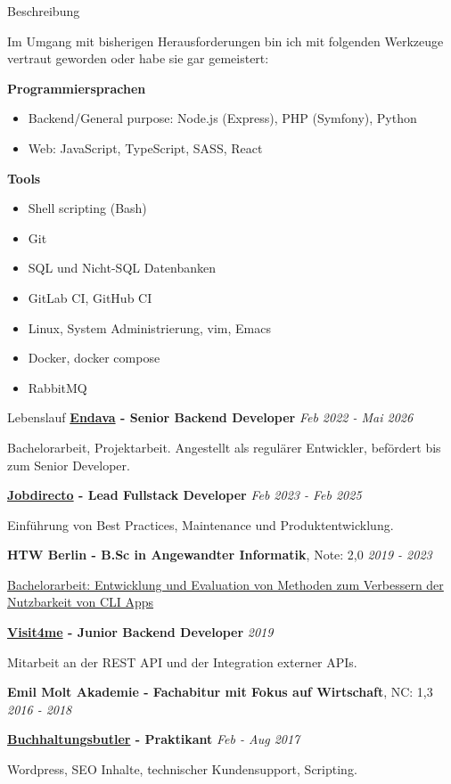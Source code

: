 \documentclass{cv}
\begin{document}
\begin{rSection}{Beschreibung}
\begin{minipage}[t]{\skillWidth\linewidth}
    \medskip

    Im Umgang mit bisherigen Herausforderungen bin ich mit folgenden Werkzeuge vertraut geworden oder habe sie gar gemeistert:
    
    \textbf{Programmiersprachen}
    \begin{itemize}
      \item Backend/General purpose: Node.js (Express), PHP (Symfony), Python
      \item Web: JavaScript, TypeScript, SASS, React
    \end{itemize}

    \textbf{Tools}
    \begin{itemize}
      \item Shell scripting (Bash)
      \item Git
      \item SQL und Nicht-SQL Datenbanken
      \item GitLab CI, GitHub CI
      \item Linux, System Administrierung, vim, Emacs
      \item Docker, docker compose
      \item RabbitMQ
    \end{itemize}

  \end{minipage}
\end{rSection}

\begin{rSection}{Lebenslauf}
  \textbf{\href{https://www.endava.de/}{Endava} - Senior Backend Developer}
  \hfill {\em Feb 2022 - Mai 2026}

  Bachelorarbeit, Projektarbeit. Angestellt als regulärer Entwickler, befördert bis zum Senior Developer.

  \textbf{\href{https://www.jobdirecto.com/}{Jobdirecto} - Lead Fullstack Developer}
  \hfill {\em Feb 2023 - Feb 2025}

  Einführung von Best Practices, Maintenance und Produktentwicklung.

  \textbf{HTW Berlin - B.Sc in Angewandter Informatik}, Note: 2,0 \hfill {\em 2019 - 2023}
  
  \href{https://github.com/jneidel/ba}{Bachelorarbeit: Entwicklung und Evaluation von Methoden zum Verbessern der Nutzbarkeit von CLI Apps}
  
  \textbf{\href{https://reach-out.app}{Visit4me} - Junior Backend Developer}
  \hfill {\em 2019}

  Mitarbeit an der REST API und der Integration externer APIs.

  \textbf{Emil Molt Akademie - Fachabitur mit Fokus auf Wirtschaft}, NC: 1,3 \hfill {\em 2016 - 2018}

  \smallskip
    \textbf{\href{https://buchhaltungsbutler.de/}{Buchhaltungsbutler} - Praktikant}
    \hfill {\em Feb - Aug 2017}

    Wordpress, SEO Inhalte, technischer Kundensupport, Scripting.

\end{rSection}
\pagebreak
\end{document}
